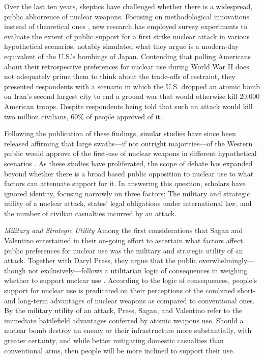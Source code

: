 \documentclass[12pt]{article}
\begin{document}
Over the last ten years, skeptics have challenged whether there is a widespread, public abhorrence of nuclear weapons. Focusing on methodological innovations instead of theoretical ones \citep{smetana_forum_2021}, new research has employed survey experiments to evaluate the extent of public support for a first strike nuclear attack in various hypothetical scenarios. \citet{sagan_revisiting_2017} notably simulated what they argue is a modern-day equivalent of the U.S.'s bombings of Japan. Contending that polling Americans about their retrospective preferences for nuclear use during World War II does not adequately prime them to think about the trade-offs of restraint, they presented respondents with a scenario in which the U.S. dropped an atomic bomb on Iran's second largest city to end a ground war that would otherwise kill 20,000 American troops. Despite respondents being told that such an attack would kill two million civilians, 60\% of people approved of it.

Following the publication of these findings, similar studies have since been released affirming that large swaths—if not outright majorities—of the Western public would approve of the first-use of nuclear weapons in different hypothetical scenarios \citep{aronow_note_2019,haworth_what_2019, dill_kettles_2022,schwartz_when_2024}. As these studies have proliferated, the scope of debate has expanded beyond whether there is a broad based public opposition to nuclear use to what factors can attenuate support for it. In answering this question, scholars have ignored identity, focusing narrowly on three factors: The military and strategic utility of a nuclear attack, states' legal obligations under international law, and the number of civilian casualties incurred by an attack.

\textit{Military and Strategic Utility} Among the first considerations that Sagan and Valentino entertained in their on-going effort to ascertain what factors affect public preferences for nuclear use was the military and strategic utility of an attack. Together with Daryl Press, they argue that the public overwhelmingly—though not exclusively—follows a utilitarian logic of consequences in weighing whether to support nuclear use \citep{press_atomic_2013}. According to the logic of consequences, people's support for nuclear use is predicated on their perceptions of the combined short- and long-term advantages of nuclear weapons as compared to conventional ones. By the military utility of an attack, Press, Sagan, and Valentino refer to the immediate battlefield advantages conferred by atomic weapons use. Should a nuclear bomb destroy an enemy or their infrastructure more substantially, with greater certainty, and while better mitigating domestic casualties than conventional arms, then people will be more inclined to support their use.
\end{document}
